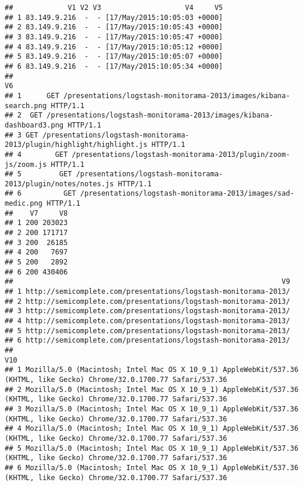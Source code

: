 \documentclass[]{article}
\begin{document}
\begin{verbatim}
##             V1 V2 V3                    V4     V5
## 1 83.149.9.216  -  - [17/May/2015:10:05:03 +0000]
## 2 83.149.9.216  -  - [17/May/2015:10:05:43 +0000]
## 3 83.149.9.216  -  - [17/May/2015:10:05:47 +0000]
## 4 83.149.9.216  -  - [17/May/2015:10:05:12 +0000]
## 5 83.149.9.216  -  - [17/May/2015:10:05:07 +0000]
## 6 83.149.9.216  -  - [17/May/2015:10:05:34 +0000]
##                                                                                   V6
## 1      GET /presentations/logstash-monitorama-2013/images/kibana-search.png HTTP/1.1
## 2  GET /presentations/logstash-monitorama-2013/images/kibana-dashboard3.png HTTP/1.1
## 3 GET /presentations/logstash-monitorama-2013/plugin/highlight/highlight.js HTTP/1.1
## 4        GET /presentations/logstash-monitorama-2013/plugin/zoom-js/zoom.js HTTP/1.1
## 5         GET /presentations/logstash-monitorama-2013/plugin/notes/notes.js HTTP/1.1
## 6          GET /presentations/logstash-monitorama-2013/images/sad-medic.png HTTP/1.1
##    V7     V8
## 1 200 203023
## 2 200 171717
## 3 200  26185
## 4 200   7697
## 5 200   2892
## 6 200 430406
##                                                                V9
## 1 http://semicomplete.com/presentations/logstash-monitorama-2013/
## 2 http://semicomplete.com/presentations/logstash-monitorama-2013/
## 3 http://semicomplete.com/presentations/logstash-monitorama-2013/
## 4 http://semicomplete.com/presentations/logstash-monitorama-2013/
## 5 http://semicomplete.com/presentations/logstash-monitorama-2013/
## 6 http://semicomplete.com/presentations/logstash-monitorama-2013/
##                                                                                                                       V10
## 1 Mozilla/5.0 (Macintosh; Intel Mac OS X 10_9_1) AppleWebKit/537.36 (KHTML, like Gecko) Chrome/32.0.1700.77 Safari/537.36
## 2 Mozilla/5.0 (Macintosh; Intel Mac OS X 10_9_1) AppleWebKit/537.36 (KHTML, like Gecko) Chrome/32.0.1700.77 Safari/537.36
## 3 Mozilla/5.0 (Macintosh; Intel Mac OS X 10_9_1) AppleWebKit/537.36 (KHTML, like Gecko) Chrome/32.0.1700.77 Safari/537.36
## 4 Mozilla/5.0 (Macintosh; Intel Mac OS X 10_9_1) AppleWebKit/537.36 (KHTML, like Gecko) Chrome/32.0.1700.77 Safari/537.36
## 5 Mozilla/5.0 (Macintosh; Intel Mac OS X 10_9_1) AppleWebKit/537.36 (KHTML, like Gecko) Chrome/32.0.1700.77 Safari/537.36
## 6 Mozilla/5.0 (Macintosh; Intel Mac OS X 10_9_1) AppleWebKit/537.36 (KHTML, like Gecko) Chrome/32.0.1700.77 Safari/537.36
\end{verbatim}
\end{document}
